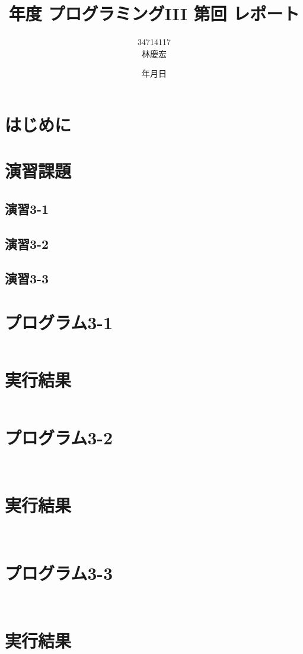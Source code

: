 \documentclass[a4j,11pt]{jarticle}
\title{{\thisyear}年度 プログラミングIII 第回 レポート}
\date{\the\year 年\the\month 月\the\day 日}
\author{34714117 \\ 林慶宏}
\begin{document}
\maketitle
\clearpage

\section{はじめに}
\section{演習課題}
\subsection{演習3-1}

\subsection{演習3-2}

\subsection{演習3-3}

\section{プログラム3-1}
\begin{verbatim}

\end{verbatim}
\section{実行結果}
\begin{verbatim}

\end{verbatim}
\section{プログラム3-2}
\begin{verbatim}
    
\end{verbatim}
\section{実行結果}
\begin{verbatim}
    
\end{verbatim}
\section{プログラム3-3}
\begin{verbatim}
  
\end{verbatim}
\section{実行結果}
\begin{verbatim}

\end{verbatim}
\end{document}
